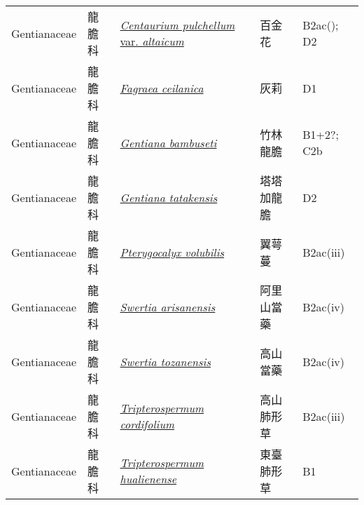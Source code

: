{\begin{longtable}{L{2.5cm}L{2cm}L{5cm}L{2.5cm}L{3cm}}
    Gentianaceae & 龍膽科 & \href{http://www.theplantlist.org/tpl1.1/search?q=Centaurium+pulchellum+var.+altaicum}{\textit{Centaurium pulchellum} var. \textit{altaicum} } & 百金花 & B2ac(); D2    \\
    Gentianaceae & 龍膽科 & \href{http://www.theplantlist.org/tpl1.1/search?q=Fagraea+ceilanica}{\textit{Fagraea ceilanica} } & 灰莉 & D1    \\
    Gentianaceae & 龍膽科 & \href{http://www.theplantlist.org/tpl1.1/search?q=Gentiana+bambuseti}{\textit{Gentiana bambuseti} } & 竹林龍膽 & B1+2?; C2b    \\
    Gentianaceae & 龍膽科 & \href{http://www.theplantlist.org/tpl1.1/search?q=Gentiana+tatakensis}{\textit{Gentiana tatakensis} } & 塔塔加龍膽 & D2    \\
    Gentianaceae & 龍膽科 & \href{http://www.theplantlist.org/tpl1.1/search?q=Pterygocalyx+volubilis}{\textit{Pterygocalyx volubilis} } & 翼萼蔓 & B2ac(iii)    \\
    Gentianaceae & 龍膽科 & \href{http://www.theplantlist.org/tpl1.1/search?q=Swertia+arisanensis}{\textit{Swertia arisanensis} } & 阿里山當藥 & B2ac(iv)    \\
    Gentianaceae & 龍膽科 & \href{http://www.theplantlist.org/tpl1.1/search?q=Swertia+tozanensis}{\textit{Swertia tozanensis} } & 高山當藥 & B2ac(iv)    \\
    Gentianaceae & 龍膽科 & \href{http://www.theplantlist.org/tpl1.1/search?q=Tripterospermum+cordifolium}{\textit{Tripterospermum cordifolium} } & 高山肺形草 & B2ac(iii)    \\
    Gentianaceae & 龍膽科 & \href{http://www.theplantlist.org/tpl1.1/search?q=Tripterospermum+hualienense}{\textit{Tripterospermum hualienense} } & 東臺肺形草 & B1    \\

\end{longtable}}
